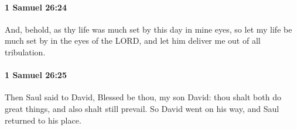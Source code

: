 		\paragraph{1 Samuel 26:24} %
			\label{1SAMUEL-26-24}

			And, behold, as thy life was much set by this day in mine eyes, so let my life be much set by in the eyes of the LORD, and let him deliver me out of all tribulation.


		\paragraph{1 Samuel 26:25} %
			\label{1SAMUEL-26-25}

			Then Saul said to David, Blessed be thou, my son David: thou shalt both do great things, and also shalt still prevail. So David went on his way, and Saul returned to his place.

